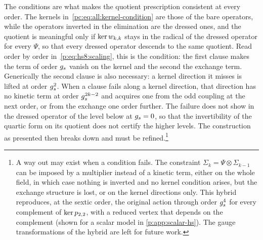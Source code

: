The conditions are what makes the quotient prescription consistent at every order.
The kernels in~\eqref{pc:eq:all:kernel-condition} are those of the bare operators, while the operators inverted in the elimination are the dressed ones, and the quotient is meaningful only if $\ker w_{k,k}$ stays in the radical of the dressed operator for every $\Psi$, so that every dressed operator descends to the same quotient.
Read order by order in~\eqref{p:eq:hs8:scaling}, this is the condition: the first clause makes the term of order $g_s$ vanish on the kernel and the second the exchange term.
Generically the second clause is also necessary: a kernel direction it misses is lifted at order $g_s^2$.
When a clause fails along a kernel direction, that direction has no kinetic term at order $g_s^{2 k - 2}$ and acquires one from the odd coupling at the next order, or from the exchange one order further.
The failure does not show in the dressed operator of the level below at $g_s = 0$, so that the invertibility of the quartic form on its quotient does not certify the higher levels.
The construction as presented then breaks down and must be refined.\footnote{
  A way out may exist when a condition fails.
  The constraint $\Sigma_k = \Psi \otimes \Sigma_{k - 1}$ can be imposed by a multiplier instead of a kinetic term, either on the whole field, in which case nothing is inverted and no kernel condition arises, but the exchange structure is lost, or on the kernel directions only.
  This hybrid reproduces, at the sextic order, the original action through order $g_s^4$ for every complement of $\ker p_{2,2}$, with a reduced vertex that depends on the complement (shown for a scalar model in \cref{p:app:scalar-hs}).
  The gauge transformations of the hybrid are left for future work.
}
